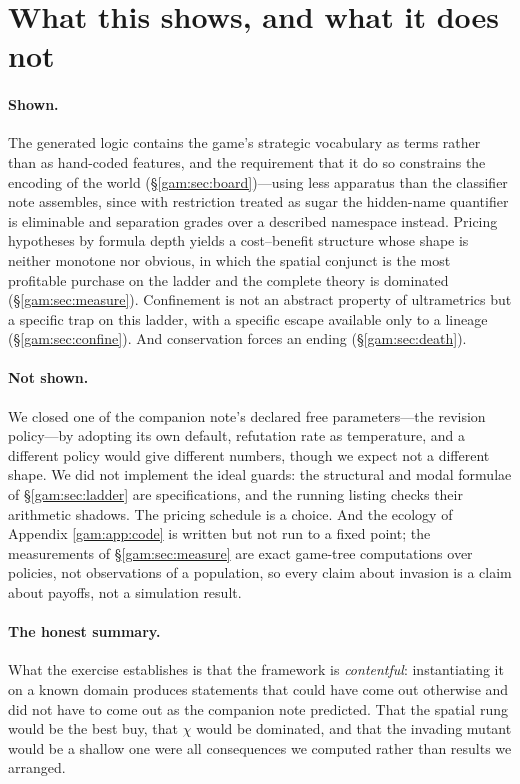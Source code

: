 \section{What this shows, and what it does not}\label{gam:S11}

\paragraph{Shown.} The generated logic contains the game's strategic vocabulary
as terms rather than as hand-coded features, and the requirement that it do so
constrains the encoding of the world (\S\ref{gam:sec:board})---using less apparatus
than the classifier note assembles, since with restriction treated as sugar the
hidden-name quantifier is eliminable and separation grades over a described
namespace instead. Pricing hypotheses by
formula depth yields a cost--benefit structure whose shape is neither monotone
nor obvious, in which the spatial conjunct is the most profitable purchase on
the ladder and the complete theory is dominated (\S\ref{gam:sec:measure}).
Confinement is not an abstract property of ultrametrics but a specific trap on
this ladder, with a specific escape available only to a lineage
(\S\ref{gam:sec:confine}). And conservation forces an ending (\S\ref{gam:sec:death}).

\paragraph{Not shown.} We closed one of the companion note's declared free
parameters---the revision policy---by adopting its own default, refutation rate
as temperature, and a different policy would give different numbers, though we
expect not a different shape. We did not implement the ideal guards: the
structural and modal formulae of \S\ref{gam:sec:ladder} are specifications, and the
running listing checks their arithmetic shadows. The pricing schedule is a
choice. And the ecology of Appendix \ref{gam:app:code} is written but not run to a
fixed point; the measurements of \S\ref{gam:sec:measure} are exact game-tree
computations over policies, not observations of a population, so every claim
about invasion is a claim about payoffs, not a simulation result.

\paragraph{The honest summary.} What the exercise establishes is that the
framework is \emph{contentful}: instantiating it on a known domain produces
statements that could have come out otherwise and did not have to come out as
the companion note predicted. That the spatial rung would be the best buy, that
$\chi$ would be dominated, and that the invading mutant would be a shallow one
were all consequences we computed rather than results we arranged.

